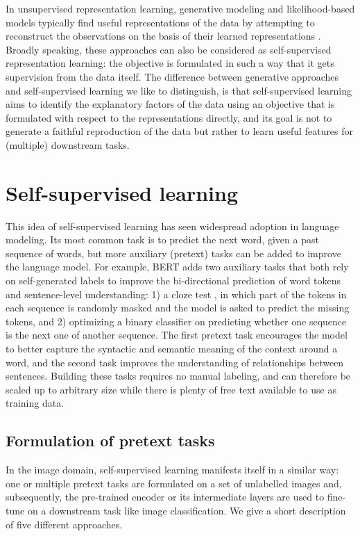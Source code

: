 In unsupervised representation learning, generative modeling and likelihood-based models typically find useful representations of the data by attempting to reconstruct the observations on the basis of their learned representations \cite{goodfellow2014generative, unsupervised_gan}.
Broadly speaking, these approaches can also be considered as self-supervised representation learning: the objective is formulated in such a way that it gets supervision from the data itself.
The difference between generative approaches and self-supervised learning we like to distinguish, is that self-supervised learning aims to identify the explanatory factors of the data using an objective that is formulated with respect to the representations directly, and its goal is not to generate a faithful reproduction of the data but rather to learn useful features for (multiple) downstream tasks.
\\

\section{Self-supervised learning}
This idea of self-supervised learning has seen widespread adoption in language modeling.
Its most common task is to predict the next word, given a past sequence of words, but more auxiliary (pretext) tasks can be added to improve the language model.
For example, BERT \cite{Devlin2019BERTPO} adds two auxiliary tasks that both rely on self-generated labels to improve the bi-directional prediction of word tokens and sentence-level understanding: 1) a cloze test \cite{doi:10.1177/107769905303000401}, in which part of the tokens in each sequence is randomly masked and the model is asked to predict the missing tokens, and 2) optimizing a binary classifier on predicting whether one sequence is the next one of another sequence.
The first pretext task encourages the model to better capture the syntactic and semantic meaning of the context around a word, and the second task improves the understanding of relationships between sentences.
Building these tasks requires no manual labeling, and can therefore be scaled up to arbitrary size while there is plenty of free text available to use as training data.\\

\subsection{Formulation of pretext tasks}
In the image domain, self-supervised learning manifests itself in a similar way: one or multiple pretext tasks are formulated on a set of unlabelled images and, subsequently, the pre-trained encoder or its intermediate layers are used to fine-tune on a downstream task like image classification.
We give a short description of five different approaches.


